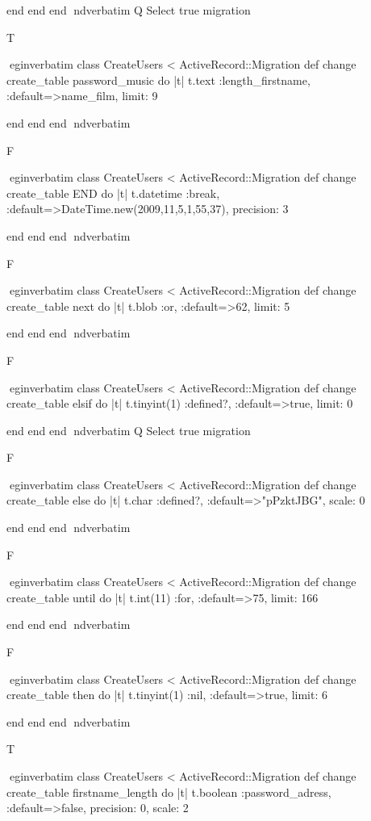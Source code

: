     end 
  end 
end
nd{verbatim}
Q
 Select true migration

T

egin{verbatim}
 class CreateUsers < ActiveRecord::Migration 
  def change 
    create_table password_music do |t| 
      t.text :length_firstname, :default=>name_film, limit: 9
    
    end 
  end 
end
nd{verbatim}

F

egin{verbatim}
 class CreateUsers < ActiveRecord::Migration 
  def change 
    create_table END do |t| 
      t.datetime :break, :default=>DateTime.new(2009,11,5,1,55,37), precision: 3
    
    end 
  end 
end
nd{verbatim}

F

egin{verbatim}
 class CreateUsers < ActiveRecord::Migration 
  def change 
    create_table next do |t| 
      t.blob :or, :default=>62, limit: 5
    
    end 
  end 
end
nd{verbatim}

F

egin{verbatim}
 class CreateUsers < ActiveRecord::Migration 
  def change 
    create_table elsif do |t| 
      t.tinyint(1) :defined?, :default=>true, limit: 0
    
    end 
  end 
end
nd{verbatim}
Q
 Select true migration

F

egin{verbatim}
 class CreateUsers < ActiveRecord::Migration 
  def change 
    create_table else do |t| 
      t.char :defined?, :default=>"pPzktJBG", scale: 0
    
    end 
  end 
end
nd{verbatim}

F

egin{verbatim}
 class CreateUsers < ActiveRecord::Migration 
  def change 
    create_table until do |t| 
      t.int(11) :for, :default=>75, limit: 166
    
    end 
  end 
end
nd{verbatim}

F

egin{verbatim}
 class CreateUsers < ActiveRecord::Migration 
  def change 
    create_table then do |t| 
      t.tinyint(1) :nil, :default=>true, limit: 6
    
    end 
  end 
end
nd{verbatim}

T

egin{verbatim}
 class CreateUsers < ActiveRecord::Migration 
  def change 
    create_table firstname_length do |t| 
      t.boolean :password_adress, :default=>false, precision: 0, scale: 2
    
